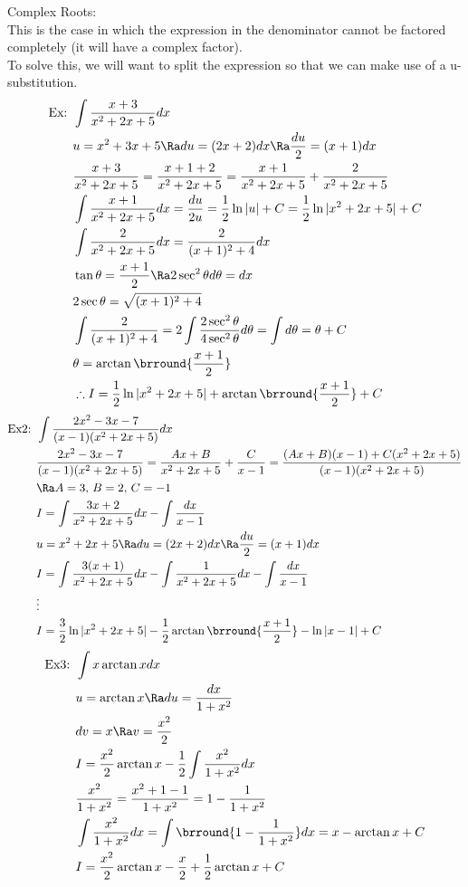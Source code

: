 Complex Roots:\\
This is the case in which the expression in the denominator cannot be factored completely (it will have a complex factor).\\
To solve this, we will want to split the expression so that we can make use of a u-substitution.
\begin{align*}
    \text{Ex: }&\int\frac{x+3}{x^2+2x+5}dx\\
    &u=x^2+3x+5\Ra du=(2x+2)dx\Ra \frac{du}{2}=(x+1)dx\\
    &\frac{x+3}{x^2+2x+5}=\frac{x+1+2}{x^2+2x+5}=\frac{x+1}{x^2+2x+5}+\frac{2}{x^2+2x+5}\\
    &\int\frac{x+1}{x^2+2x+5}dx=\frac{du}{2u}=\frac{1}{2}\ln|u|+C=\frac{1}{2}\ln|x^2+2x+5|+C\\
    &\int\frac{2}{x^2+2x+5}dx=\frac{2}{(x+1)^2+4}dx\\
    &\tan\theta=\frac{x+1}{2}\Ra 2\sec^2\theta d\theta=dx\\
    &2\sec\theta=\sqrt{(x+1)^2+4}\\
    &\int\frac{2}{(x+1)^2+4}=2\int\frac{2\sec^2\theta}{4\sec^2\theta}d\theta=\int d\theta=\theta+C\\
    &\theta=\arctan\brround{\frac{x+1}{2}}\\
    &\therefore I=\frac{1}{2}\ln|x^2+2x+5|+\arctan\brround{\frac{x+1}{2}}+C
\end{align*}
\begin{align*}
    \text{Ex2: }&\int\frac{2x^2-3x-7}{(x-1)(x^2+2x+5)}dx\\
    &\frac{2x^2-3x-7}{(x-1)(x^2+2x+5)}=\frac{Ax+B}{x^2+2x+5}+\frac{C}{x-1}=\frac{(Ax+B)(x-1)+C(x^2+2x+5)}{(x-1)(x^2+2x+5)}\\
    &\Ra A=3,\,B=2,\,C=-1\\
    &I=\int\frac{3x+2}{x^2+2x+5}dx-\int\frac{dx}{x-1}\\
    &u=x^2+2x+5\Ra du=(2x+2)dx\Ra \frac{du}{2}=(x+1)dx\\
    &I=\int\frac{3(x+1)}{x^2+2x+5}dx-\int\frac{1}{x^2+2x+5}dx-\int\frac{dx}{x-1}\\
    &\vdots\\
    &I=\frac{3}{2}\ln|x^2+2x+5|-\frac{1}{2}\arctan\brround{\frac{x+1}{2}}-\ln|x-1|+C
\end{align*}
\begin{align*}
    \text{Ex3: }&\int x\arctan xdx\\
    &u=\arctan x\Ra du=\frac{dx}{1+x^2}\\
    &dv=x\Ra v=\frac{x^2}{2}\\
    &I=\frac{x^2}{2}\arctan x-\frac{1}{2}\int\frac{x^2}{1+x^2}dx\\
    &\frac{x^2}{1+x^2}=\frac{x^2+1-1}{1+x^2}=1-\frac{1}{1+x^2}\\
    &\int\frac{x^2}{1+x^2}dx=\int\brround{1-\frac{1}{1+x^2}}dx=x-\arctan x +C\\
    &I=\frac{x^2}{2}\arctan x-\frac{x}{2}+\frac{1}{2}\arctan x+C
\end{align*}

